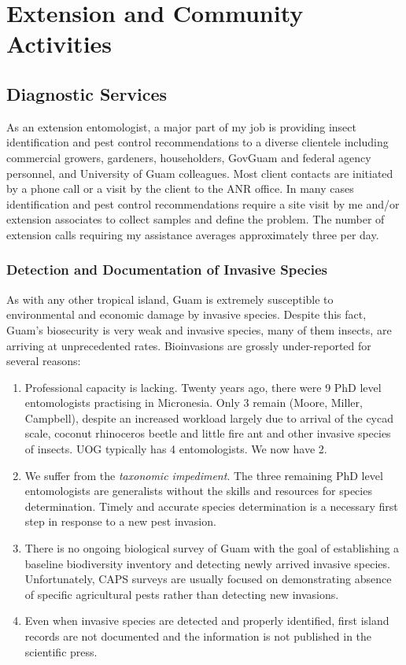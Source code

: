 \documentclass[12pt,oneside,english]{scrbook}
\begin{document}
\tableofcontents{}


\chapter{Extension and Community Activities}

\section{Diagnostic Services}

As an extension entomologist, a major part of my job is providing
insect identification and pest control recommendations to a diverse
clientele including commercial growers, gardeners, householders, GovGuam
and federal agency personnel, and University of Guam colleagues. Most client contacts are initiated by
a phone call or a visit by the client to the ANR office. In many cases
identification and pest control recommendations require a site visit
by me and/or extension associates to collect samples and define the
problem. The number of extension calls requiring my assistance averages
approximately three per day.

\subsection{Detection and Documentation of Invasive Species}

As with any other tropical island, Guam is extremely susceptible to environmental and economic damage by invasive species. Despite this fact, Guam's biosecurity is very weak and invasive species, many of them insects, are arriving at unprecedented rates. Bioinvasions are grossly under-reported for several reasons:
\begin{enumerate}
\item Professional capacity is lacking. Twenty years ago, there were 9 PhD level entomologists practising in Micronesia. Only 3 remain (Moore, Miller, Campbell), despite an increased workload largely due to arrival of the cycad scale, coconut rhinoceros beetle and little fire ant and other invasive species of insects. UOG typically has 4 entomologists. We now have 2.
\item We suffer from the \emph{taxonomic impediment}. The three remaining PhD level entomologists are generalists without the skills and resources for species determination. Timely and accurate species determination is a necessary first step in response to a new pest invasion.
\item There is no ongoing biological survey of Guam with the goal of establishing a baseline biodiversity inventory and detecting newly arrived invasive species. Unfortunately, CAPS surveys are usually focused on demonstrating absence of specific agricultural pests rather than detecting new invasions.
\item Even when invasive species are detected and properly identified, first island records are not documented and the information is not published in the scientific press. 
\end{enumerate}
\end{document}
